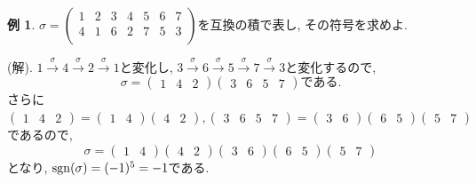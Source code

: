 \documentclass[dvipdfmx,a4paper,11pt]{article} %
\newcommand{\sgn}{{\rm sgn}}
\theoremstyle{definition}
\newtheorem{exa}[thm]{例}
\begin{document}
 \begin{exa}
 $
 \sigma 
  =
 \begin{pmatrix}
 1& 2  &3 & 4 & 5 & 6 & 7\\
 4& 1  &6  &2 &7 & 5 & 3\\
 \end{pmatrix} 
 $を互換の積で表し, その符号を求めよ.
 
 (解). 
 $1 \overset{\sigma}{\rightarrow} 4 \overset{\sigma}{\rightarrow}2 \overset{\sigma}{\rightarrow}1 $と変化し,  
  $3 \overset{\sigma}{\rightarrow} 6\overset{\sigma}{\rightarrow}5 \overset{\sigma}{\rightarrow}7 \overset{\sigma}{\rightarrow}3$と変化するので, 
  $$
  \sigma = 
   \begin{pmatrix}
 1& 4 &2 
 \end{pmatrix} 
    \begin{pmatrix}
 3& 6 &5 &7
 \end{pmatrix} 
 \text{である.}
  $$
  さらに
  $   \begin{pmatrix}
 1& 4 &2 
 \end{pmatrix} 
 = 
 \begin{pmatrix}
 1& 4  
 \end{pmatrix} 
 \begin{pmatrix}
 4 &2 
 \end{pmatrix},
\begin{pmatrix}
 3& 6 &5 &7
 \end{pmatrix} 
 =
 \begin{pmatrix}
 3& 6  
 \end{pmatrix} 
  \begin{pmatrix}
 6& 5  
 \end{pmatrix} 
  \begin{pmatrix}
 5& 7  
 \end{pmatrix} 
 $
 であるので, 
 $$
\sigma= 
\begin{pmatrix}
 1& 4  
 \end{pmatrix} 
 \begin{pmatrix}
 4 &2 
 \end{pmatrix}
 \begin{pmatrix}
 3& 6  
 \end{pmatrix} 
  \begin{pmatrix}
 6& 5  
 \end{pmatrix} 
  \begin{pmatrix}
 5& 7  
 \end{pmatrix} 
 $$
 となり, $\sgn(\sigma)= (-1)^{5}=-1$である.
 
 \end{exa}
\end{document}
